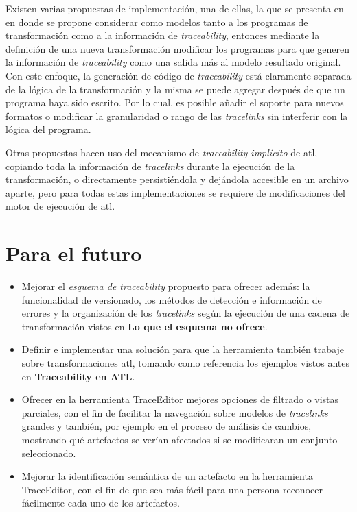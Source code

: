 \documentclass[a4paper,12pt,oneside,spanish]{book}
\begin{document}
Existen varias propuestas de implementación, una de ellas, la que se presenta en \cite{Jouault} en donde se propone considerar como modelos tanto a los programas de transformación como a la información de \textit{traceability}, entonces mediante la definición de una nueva transformación modificar los programas para que generen la información de \textit{traceability} como una salida más al modelo resultado original. Con este enfoque, la generación de código de \textit{traceability} está claramente separada de la lógica de la transformación y la misma se puede agregar después de que un programa haya sido escrito. Por lo cual, es posible añadir el soporte para nuevos formatos o modificar la granularidad o rango de las \textit{tracelinks} sin interferir con la lógica del programa.

Otras propuestas hacen uso del mecanismo de \textit{traceability implícito} de \gls{atl}, copiando toda la información de \textit{tracelinks} durante la ejecución de la transformación, o directamente persistiéndola y dejándola accesible en un archivo aparte, pero para todas estas implementaciones se requiere de modificaciones del motor de ejecución de \gls{atl}.


\section*{Para el futuro}

\begin{itemize}

\item Mejorar el \textit{esquema de traceability} propuesto para ofrecer además: la funcionalidad de versionado, los métodos de detección e información de errores y la organización de los \textit{tracelinks} según la ejecución de una cadena de transformación vistos en \textbf{Lo que el esquema no ofrece}.

\item Definir e implementar una solución para que la herramienta también trabaje sobre transformaciones \gls{atl}, tomando como referencia los ejemplos vistos antes en \textbf{Traceability en ATL}.

\item Ofrecer en la herramienta \textsf{TraceEditor} mejores opciones de filtrado o vistas parciales, con el fin de facilitar la navegación sobre modelos de \textit{tracelinks} grandes y también, por ejemplo en el proceso de análisis de cambios, mostrando qué artefactos se verían afectados si se modificaran un conjunto seleccionado.

\item Mejorar la identificación semántica de un artefacto en la herramienta \textsf{TraceEditor}, con el fin de que sea más fácil para una persona reconocer fácilmente cada uno de los artefactos.

\end{itemize}
\end{document}
